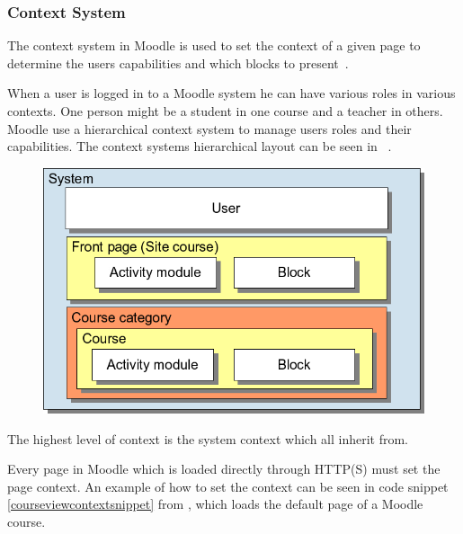 	
	
	\subsubsection{Context System}

The context system in Moodle is used to set the context of a given page to determine the users capabilities and which blocks to present~\cite{moodlerolesandmodules}.
 
When a user is logged in to a Moodle system he can have various roles in various contexts. 
One person might be a student in one course and a teacher in others. 
Moodle use a hierarchical context system to manage users roles and their capabilities. 
The context systems hierarchical layout can be seen in ~\cite{moodlefilemoodlecontext}.
 
 \begin{figure}
	 \centering
		 \includegraphics[width=\textwidth]{images/moodle-contexts.png}
	 \label{fig:moodle-contexts}
 \end{figure}

The highest level of context is the system context which all inherit from. 

Every page in Moodle which is loaded directly through HTTP(S) must set the page context. 
An example of how to set the context can be seen in code snippet \ref{courseviewcontextsnippet} from , which loads the default page of a Moodle course.

